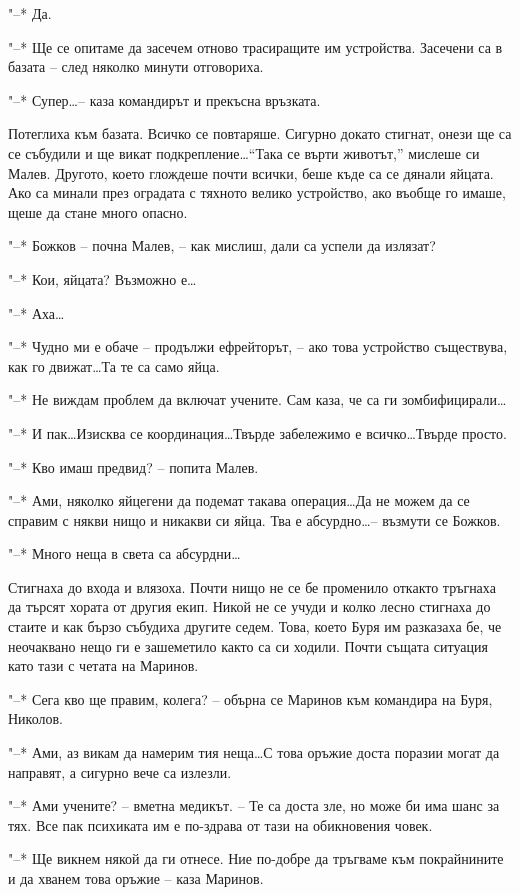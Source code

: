 \documentclass[ebook,openany,12pt]{memoir}
\begin{document}
"--* Да.

"--* Ще се опитаме да засечем отново трасиращите им устройства. Засечени са в базата – след няколко минути отговориха.

"--* Супер\ldots – каза командирът и прекъсна връзката.

Потеглиха към базата. Всичко се повтаряше. Сигурно докато стигнат, онези ще са се събудили и ще викат подкрепление\ldots ``Така се върти животът,'' мислеше си Малев. Другото, което глождеше почти всички, беше къде са се дянали яйцата. Ако са минали през оградата с тяхното велико устройство, ако въобще го имаше, щеше да стане много опасно.

"--* Божков -- почна Малев, – как мислиш, дали са успели да излязат?

"--* Кои, яйцата? Възможно е\ldots

"--* Аха\ldots

"--* Чудно ми е обаче -- продължи ефрейторът, – ако това устройство съществува, как го движат\ldots Та те са само яйца.

"--* Не виждам проблем да включат учените. Сам каза, че са ги зомбифицирали\ldots

"--* И пак\ldots Изисква се координация\ldots Твърде забележимо е всичко\ldots Твърде просто.

"--* Кво имаш предвид? – попита Малев.

"--* Ами, няколко яйцегени да подемат такава операция\ldots Да не можем да се справим с някви нищо и никакви си яйца. Тва е абсурдно\ldots – възмути се Божков.

"--* Много неща в света са абсурдни\ldots

Стигнаха до входа и влязоха. Почти нищо не се бе променило откакто тръгнаха да търсят хората от другия екип. Никой не се учуди и колко лесно стигнаха до стаите и как бързо събудиха другите седем. Това, което Буря им разказаха бе, че неочаквано нещо ги е зашеметило както са си ходили. Почти същата ситуация като тази с четата на Маринов. 

"--* Сега кво ще правим, колега? – обърна се Маринов към командира на Буря, Николов.

"--* Ами, аз викам да намерим тия неща\ldots С това оръжие доста поразии могат да направят, а сигурно вече са излезли.

"--* Ами учените? – вметна медикът. – Те са доста зле, но може би има шанс за тях. Все пак психиката им е по-здрава от тази на обикновения човек.

"--* Ще викнем някой да ги отнесе. Ние по-добре да тръгваме към покрайнините и да хванем това оръжие – каза Маринов.
\end{document}
